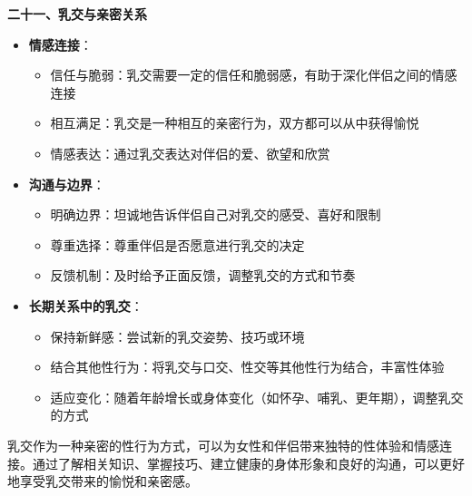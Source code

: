\documentclass[12pt,UTF8]{ctexbook}
\begin{document}
  \textbf{二十一、乳交与亲密关系}
  \begin{itemize}
  \item \textbf{情感连接}：
    \begin{itemize}
    \item 信任与脆弱：乳交需要一定的信任和脆弱感，有助于深化伴侣之间的情感连接
    \item 相互满足：乳交是一种相互的亲密行为，双方都可以从中获得愉悦
    \item 情感表达：通过乳交表达对伴侣的爱、欲望和欣赏
    \end{itemize}
  \item \textbf{沟通与边界}：
    \begin{itemize}
    \item 明确边界：坦诚地告诉伴侣自己对乳交的感受、喜好和限制
    \item 尊重选择：尊重伴侣是否愿意进行乳交的决定
    \item 反馈机制：及时给予正面反馈，调整乳交的方式和节奏
    \end{itemize}
  \item \textbf{长期关系中的乳交}：
    \begin{itemize}
    \item 保持新鲜感：尝试新的乳交姿势、技巧或环境
    \item 结合其他性行为：将乳交与口交、性交等其他性行为结合，丰富性体验
    \item 适应变化：随着年龄增长或身体变化（如怀孕、哺乳、更年期），调整乳交的方式
    \end{itemize}
  \end{itemize}

乳交作为一种亲密的性行为方式，可以为女性和伴侣带来独特的性体验和情感连接。通过了解相关知识、掌握技巧、建立健康的身体形象和良好的沟通，可以更好地享受乳交带来的愉悦和亲密感。
\end{document}
